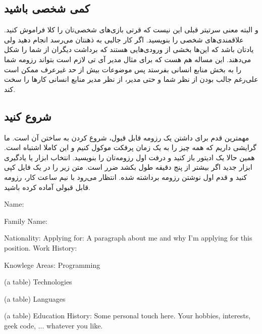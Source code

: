 \subsection*{کمی شخصی باشید}
و البته معنی سرتیتر قبلی این نیست که قرتی بازی‌های شخصی‌تان را کلا فراموش کنید. علاقمندی‌های شخصی را بنویسید. اگر کار جالبی به ذهنتان می‌رسد انجام دهید ولی یادتان باشد که این‌ها بخشی از ورودی‌هایی هستند که برداشت دیگران از شما را شکل می‌دهند. این مساله هم هست که برای مثال مدیر آی تی لازم است بتواند رزومه شما را به بخش منابع انسانی بفرستد پس موضوعات بیش از حد غیرعرف ممکن است علی‌رغم جالب بودن از نظر شما و حتی مدیر، از نظر مدیر منابع انسانی کارها را سخت کند.
\subsection*{شروع کنید}
مهمترین قدم برای داشتن یک رزومه قابل قبول، شروع کردن به ساختن آن است. ما گرایشی داریم که همه چیز را به یک زمان پرفکت موکول کنیم و این کاملا اشتباه است. همین حالا یک ادیتور باز کنید و درفت اول رزومه‌تان را بنویسید. انتخاب ابزار یا یادگیری ابزار جدید اگر بیشتر از پنج دقیقه طول بکشد ضرر است. متن زیر را در یک فایل کپی کنید و قدم اول نوشتن رزومه برداشته شده. انتظار می‌رود با نیم ساعت کار، رزومه قابل قبولی آماده کرده باشید.
\begin{frameng}
Name:

Family Name:

Nationality:
\newline
\newline
Applying for:
\newline
\newline
A paragraph about me and why I'm applying for this position.
\newline
\newline
Work History:

Knowlege Areas:
\newline
\newline
Programming

(a table)
\newline
\newline
Technologies

(a table)
\newline
\newline
Languages

(a table)
\newline
\newline
Education History:
\newline
\newline
Some personal touch here. Your hobbies, interests, geek code, ... whatever you like.
\end{frameng}